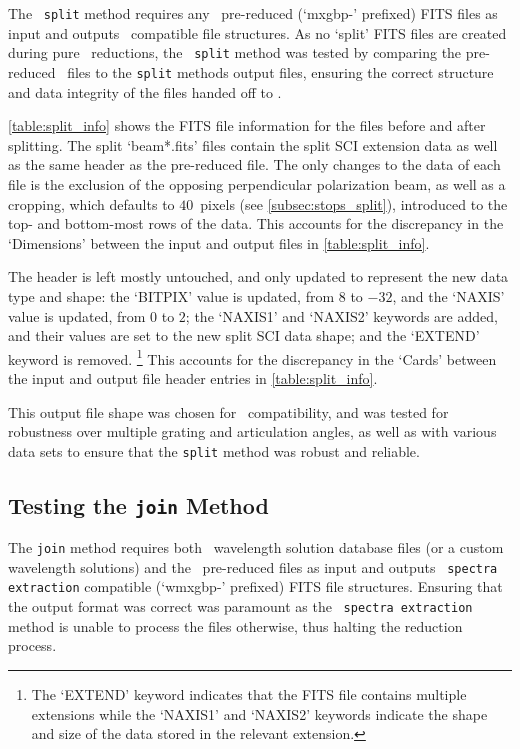 The \stops\ \texttt{split} method requires any \polsalt\ pre-reduced (`mxgbp-' prefixed) \gls{FITS} files as input and outputs \iraf\ compatible file structures. As no `split' \gls{FITS} files are created during pure \polsalt\ reductions, the \stops\ \texttt{split} method was tested by comparing the pre-reduced \polsalt\ files to the \texttt{split} methods output files, ensuring the correct structure and data integrity of the files handed off to \iraf.



\autoref{table:split_info} shows the \gls{FITS} file information for the files before and after splitting. The split `beam*.fits' files contain the split \gls{SCI} extension data as well as the same header as the pre-reduced file. The only changes to the data of each file is the exclusion of the opposing perpendicular polarization beam, as well as a cropping, which defaults to $40$~pixels (see \autoref{subsec:stops_split}), introduced to the top- and bottom-most rows of the data. This accounts for the discrepancy in the `Dimensions' between the input and output files in \autoref{table:split_info}.

The header is left mostly untouched, and only updated to represent the new data type and shape:
the `BITPIX' value is updated, from $8$ to $-32$, and the `NAXIS' value is updated, from $0$ to $2$;
the `NAXIS1' and `NAXIS2' keywords are added, and their values are set to the new split \gls{SCI} data shape;
and the `EXTEND' keyword is removed.%
\footnote{The `EXTEND' keyword indicates that the \gls{FITS} file contains multiple extensions while the `NAXIS1' and `NAXIS2' keywords indicate the shape and size of the data stored in the relevant extension.}
This accounts for the discrepancy in the `Cards' between the input and output file header entries in \autoref{table:split_info}.

This output file shape was chosen for \iraf\ compatibility, and was tested for robustness over multiple grating and articulation angles, as well as with various data sets to ensure that the \texttt{split} method was robust and reliable.

\subsection{Testing the \texttt{join} Method} \label{subsec:test_join}

The \texttt{join} method requires both \iraf\ wavelength solution database files (or a custom wavelength solutions) and the \polsalt\ pre-reduced files as input and outputs \polsalt\ \texttt{spectra extraction} compatible (`wmxgbp-' prefixed) \gls{FITS} file structures. Ensuring that the output format was correct was paramount as the \polsalt\ \texttt{spectra extraction} method is unable to process the files otherwise, thus halting the reduction process.

